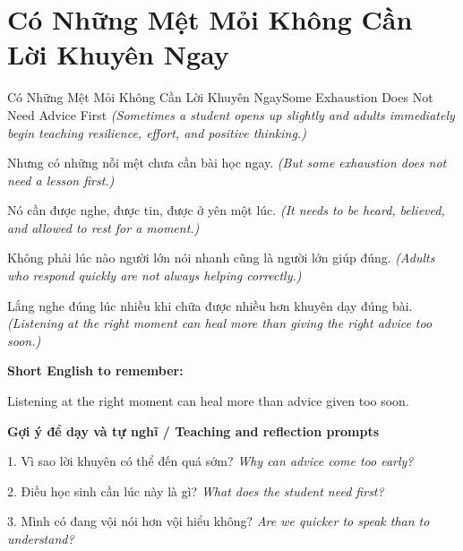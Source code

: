 \section{Có Những Mệt Mỏi Không Cần Lời Khuyên Ngay}
\begin{truyen}{Có Những Mệt Mỏi Không Cần Lời Khuyên Ngay}{Some Exhaustion Does Not Need Advice First}
\textit{(Sometimes a student opens up slightly and adults immediately begin teaching resilience, effort, and positive thinking.)}

Nhưng có những nỗi mệt chưa cần bài học ngay.
\textit{(But some exhaustion does not need a lesson first.)}

Nó cần được nghe, được tin, được ở yên một lúc.
\textit{(It needs to be heard, believed, and allowed to rest for a moment.)}

Không phải lúc nào người lớn nói nhanh cũng là người lớn giúp đúng.
\textit{(Adults who respond quickly are not always helping correctly.)}

\end{truyen}

\begin{baihoc}
Lắng nghe đúng lúc nhiều khi chữa được nhiều hơn khuyên dạy đúng bài.
\textit{(Listening at the right moment can heal more than giving the right advice too soon.)}
\end{baihoc}

\begin{ghinhoanh}
\textbf{Short English to remember:}

Listening at the right moment can heal more than advice given too soon.

\end{ghinhoanh}

\begin{tuhocnhanh}
\textbf{Gợi ý để dạy và tự nghĩ / Teaching and reflection prompts}

1. Vì sao lời khuyên có thể đến quá sớm? \textit{Why can advice come too early?}

2. Điều học sinh cần lúc này là gì? \textit{What does the student need first?}

3. Mình có đang vội nói hơn vội hiểu không? \textit{Are we quicker to speak than to understand?}
\end{tuhocnhanh}
